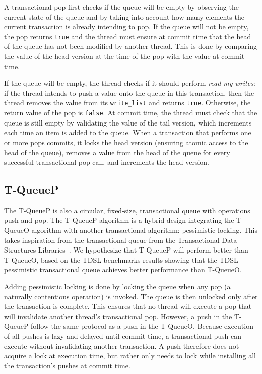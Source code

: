 A transactional pop first checks if the queue will be empty by observing the current state of the queue and by taking into account how many elements the current transaction is already intending to pop. If the queue will not be empty, the pop returns \texttt{true} and the thread must ensure at commit time that the head of the queue has not been modified by another thread. This is done by comparing the value of the head version at the time of the pop with the value at commit time. 

If the queue will be empty, the thread checks if it should perform \emph{read-my-writes}: if the thread intends to push a value onto the queue in this transaction, then the thread removes the value from its \texttt{write\_list} and returns \texttt{true}. Otherwise, the return value of the pop is \texttt{false}. At commit time, the thread must check that the queue is still empty by validating the value of the tail version, which increments each time an item is added to the queue.
When a transaction that performs one or more pops commits, it locks the head version (ensuring atomic access to the head of the queue), removes a value from the head of the queue for every successful transactional pop call, and increments the head version.


\subsection{T-QueueP}
The T-QueueP is also a circular, fixed-size, transactional queue with operations push and pop. The T-QueueP algorithm is a hybrid design integrating the T-QueueO algorithm with another transactional algorithm: pessimistic locking. This takes inspiration from the transactional queue from the Transactional Data Structures Libraries~\cite{tdsl}. We hypothesize that T-QueueP will perform better than T-QueueO, based on the TDSL benchmarks results showing that the TDSL pessimistic transactional queue achieves better performance than T-QueueO. 

Adding pessimistic locking is done by locking the queue when any pop (a naturally contentious operation) is invoked. The queue is then unlocked only after the transaction is complete. This ensures that no thread will execute a pop that will invalidate another thread's transactional pop. However, a push in the T-QueueP follow the same protocol as a push in the T-QueueO. Because execution of all pushes is lazy and delayed until commit time, a transactional push can execute without invalidating another transaction. A push therefore does not acquire a lock at execution time, but rather only needs to lock while installing all the transaction's pushes at commit time. 

